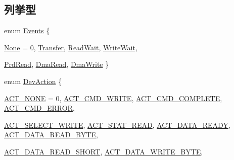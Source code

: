 \subsection*{列挙型}
\begin{DoxyCompactItemize}
\item 
enum \hyperlink{ide__disk_8hh_af60e00b78607064c5be6aa9397ea49c1}{Events} \{ \par
\hyperlink{ide__disk_8hh_af60e00b78607064c5be6aa9397ea49c1ac9d3e887722f2bc482bcca9d41c512af}{None} =  0, 
\hyperlink{ide__disk_8hh_af60e00b78607064c5be6aa9397ea49c1a0f6148e320034642ee8ec78d5cbb03aa}{Transfer}, 
\hyperlink{ide__disk_8hh_af60e00b78607064c5be6aa9397ea49c1a8601472b66eb7a6b3a758080ad6c8a81}{ReadWait}, 
\hyperlink{ide__disk_8hh_af60e00b78607064c5be6aa9397ea49c1a269f4f627793c0b24baf513c619e76ae}{WriteWait}, 
\par
\hyperlink{ide__disk_8hh_af60e00b78607064c5be6aa9397ea49c1a9335332362efb228e15c6580aef09dd9}{PrdRead}, 
\hyperlink{ide__disk_8hh_af60e00b78607064c5be6aa9397ea49c1a1639c08b8811b3c45c069169cea66e7a}{DmaRead}, 
\hyperlink{ide__disk_8hh_af60e00b78607064c5be6aa9397ea49c1a8fda525da8bab927fe38d82888083bbf}{DmaWrite}
 \}
\item 
enum \hyperlink{ide__disk_8hh_a3bae184d288bce92398b814aa118c15c}{DevAction} \{ \par
\hyperlink{ide__disk_8hh_a3bae184d288bce92398b814aa118c15caf1ee39018887e21bccccb4d0ddf0ac50}{ACT\_\-NONE} =  0, 
\hyperlink{ide__disk_8hh_a3bae184d288bce92398b814aa118c15cae1dd7a3a517c2f858845012756768591}{ACT\_\-CMD\_\-WRITE}, 
\hyperlink{ide__disk_8hh_a3bae184d288bce92398b814aa118c15ca264757d803e500a0e811725ecdd896f1}{ACT\_\-CMD\_\-COMPLETE}, 
\hyperlink{ide__disk_8hh_a3bae184d288bce92398b814aa118c15ca564e5d0c9a0d03e4e0d901a18100c6fd}{ACT\_\-CMD\_\-ERROR}, 
\par
\hyperlink{ide__disk_8hh_a3bae184d288bce92398b814aa118c15ca6610e6fb837bbd223db1436df81ef3d7}{ACT\_\-SELECT\_\-WRITE}, 
\hyperlink{ide__disk_8hh_a3bae184d288bce92398b814aa118c15caf826d1740bb55069b77c41dcda84b26a}{ACT\_\-STAT\_\-READ}, 
\hyperlink{ide__disk_8hh_a3bae184d288bce92398b814aa118c15ca040e963d0aeed73747b1a0cf0631aa6d}{ACT\_\-DATA\_\-READY}, 
\hyperlink{ide__disk_8hh_a3bae184d288bce92398b814aa118c15caba3b6986bd4622c3227ff958da2f6778}{ACT\_\-DATA\_\-READ\_\-BYTE}, 
\par
\hyperlink{ide__disk_8hh_a3bae184d288bce92398b814aa118c15ca569047ea4f8599fd76feb7ad76b1e0dc}{ACT\_\-DATA\_\-READ\_\-SHORT}, 
\hyperlink{ide__disk_8hh_a3bae184d288bce92398b814aa118c15ca0481ac27625f7b14bcee1eacb2c9153c}{ACT\_\-DATA\_\-WRITE\_\-BYTE}, 

\end{DoxyCompactItemize}
